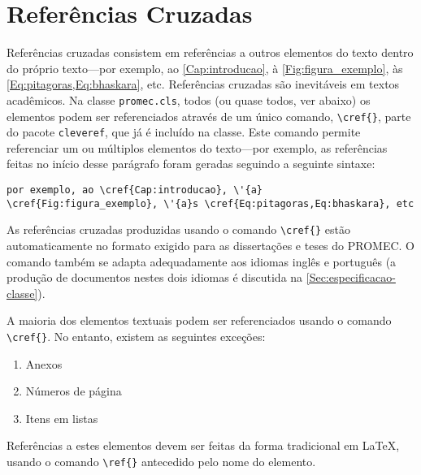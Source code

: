 \section{Referências Cruzadas}\label{Sec:referencias-cruzadas}
Referências cruzadas consistem em referências a outros elementos do texto dentro do próprio texto---por exemplo, ao \cref{Cap:introducao}, à \cref{Fig:figura_exemplo}, às \cref{Eq:pitagoras,Eq:bhaskara}, etc. Referências cruzadas são inevitáveis em textos acadêmicos. Na classe \texttt{promec.cls}, todos (ou quase todos, ver abaixo) os elementos podem ser referenciados através de um único comando, \lstinline!\cref{}!, parte do pacote \lstinline!cleveref!, que já é incluído na classe. Este comando permite referenciar um ou múltiplos elementos do texto---por exemplo, as referências feitas no início desse parágrafo foram geradas seguindo a seguinte sintaxe:
\begin{lstlisting}[breaklines=true]
por exemplo, ao \cref{Cap:introducao}, \'{a} \cref{Fig:figura_exemplo}, \'{a}s \cref{Eq:pitagoras,Eq:bhaskara}, etc
\end{lstlisting}

As referências cruzadas produzidas usando o comando \lstinline!\cref{}! estão automaticamente no formato exigido para as dissertações e teses do PROMEC. O comando também se adapta adequadamente aos idiomas inglês e português (a produção de documentos nestes dois idiomas é discutida na \cref{Sec:especificacao-classe}). 

A maioria dos elementos textuais podem ser referenciados usando o comando \lstinline!\cref{}!. No entanto, existem as seguintes exceções:
\begin{enumerate}
    \item Anexos
    \item Números de página
    \item Itens em listas
\end{enumerate}
Referências a estes elementos devem ser feitas da forma tradicional em \LaTeX, usando o comando \lstinline!\ref{}! antecedido pelo nome do elemento.

